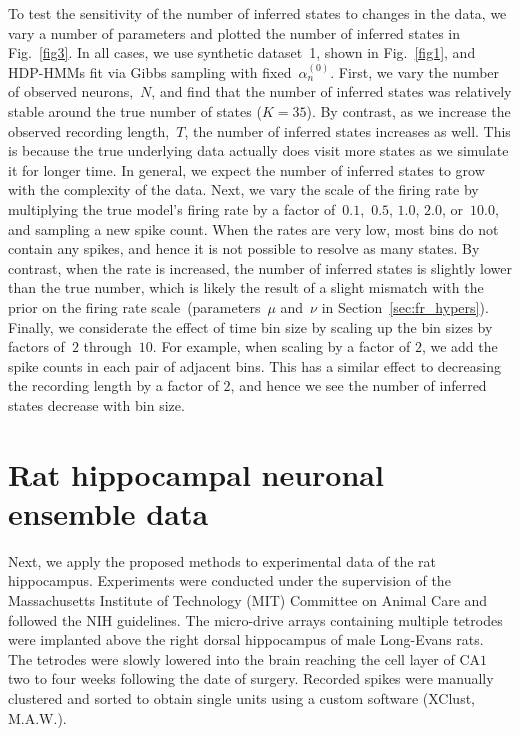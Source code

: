 To test the sensitivity of the number of inferred states to changes in
the data, we vary a number of parameters and plotted the number of
inferred states in Fig.~\ref{fig3}. In all cases, we use synthetic
dataset~1, shown in Fig.~\ref{fig1}, and HDP-HMMs fit via Gibbs
sampling with fixed~$\alpha_n^{(0)}$. First, we vary the number of
observed neurons,~$N$, and find that the number of inferred states was
relatively stable around the true number of states ($K=35$). By
contrast, as we increase the observed recording length,~$T$, the
number of inferred states increases as well. This is because the true
underlying data actually does visit more states as we simulate it for
longer time. In general, we expect the number of inferred states to
grow with the complexity of the data. Next, we vary the scale of the
firing rate by multiplying the true model's firing rate by a factor
of~$0.1$,~$0.5$, $1.0$, $2.0$, or~$10.0$, and sampling a new spike
count. When the rates are very low, most bins do not contain any
spikes, and hence it is not possible to resolve as many states. By
contrast, when the rate is increased, the number of inferred states is
slightly lower than the true number, which is likely the result of a
slight mismatch with the prior on the firing rate
scale~(parameters~$\mu$ and~$\nu$ in
Section~\ref{sec:fr_hypers}). Finally, we considerate the effect of
time bin size by scaling up the bin sizes by factors of~$2$
through~$10$. For example, when scaling by a factor of $2$, we add the
spike counts in each pair of adjacent bins. This has a similar effect
to decreasing the recording length by a factor of $2$, and hence we see
the number of inferred states decrease with bin size.

\section{Rat hippocampal neuronal ensemble data} 

Next, we apply the proposed methods to experimental data of the rat
hippocampus.  Experiments were conducted under the supervision of the
Massachusetts Institute of Technology (MIT) Committee on Animal Care
and followed the NIH guidelines.  The micro-drive arrays containing
multiple tetrodes were implanted above the right dorsal hippocampus of
male Long-Evans rats. The tetrodes were slowly lowered into the brain
reaching the cell layer of CA$1$ two to four weeks following the date of
surgery. Recorded spikes were manually clustered and sorted to obtain
single units using a custom software (XClust, M.A.W.).


